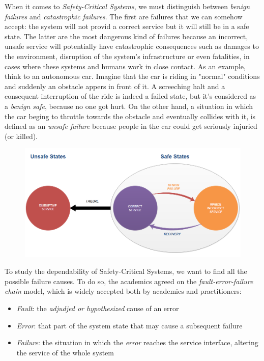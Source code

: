 When it comes to \textsl{Safety-Critical Systems}, we must distinguish between \textsl{benign failures} and \textsl{catastrophic failures}.
The first are failures that we can somehow accept: the system will not provid a correct service but it will still be in a safe state. The latter are the most dangerous kind of failures because an incorrect, unsafe service will potentially have catastrophic consequences such as damages to the environment, disruption of the system's infrastructure or even fatalities, in cases where these systems and humans work in close contact.
As an example, think to an autonomous car. Imagine that the car is riding in "normal" conditions and suddenly an obstacle appers in front of it. A screeching halt and a consequent interruption of the ride is indeed a failed state, but it's considered as a \textsl{benign safe}, because no one got hurt. On the other hand, a situation in which the car beging to throttle towards the obstacle and eventually collides with it, is defined as an \textsl{unsafe failure} because people in the car could get seriously injuried (or killed).
\newpage


\begin{figure}[h!]
	\includegraphics[width=\textwidth]{img/safe-unsafe.png}
	\caption{}
\end{figure}

To study the dependability of Safety-Critical Systems, we want to find all the possible failure causes. To do so, the academics agreed on the \textsl{fault-error-failure chain} model, which is widely accepted both by academics and practitioners:

\begin{itemize}
	\item \textsl{Fault}: the \textsl{adjudjed or hypothesized} cause of an error
	\item \textsl{Error}: that part of the system state that may cause a subsequent failure
	\item \textsl{Failure}: the situation in which the \textsl{error} reaches the service interface, altering the service of the whole system
\end{itemize}

